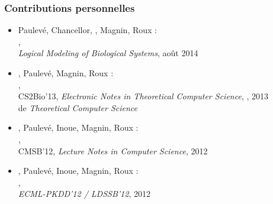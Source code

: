 \begin{frame}[c]
  \frametitle{Contributions personnelles}

\small
{}
\begin{itemize}
  \item Paulevé, Chancellor, , Magnin, Roux :\\
    ,\\
    \textit{Logical Modeling of Biological Systems},
    août 2014%
\end{itemize}

\medskip
{}
\begin{itemize}
  \item {}, Paulevé, Magnin, Roux :\\
    ,\\
    CS2Bio'13,
    \textit{Electronic Notes in Theoretical Computer Science}, , 2013\\
     de \textit{Theoretical Computer Science}
  \item {}, Paulevé, Inoue, Magnin, Roux :\\
    ,\\ %
    CMSB'12, \textit{Lecture Notes in Computer Science}, %
    2012
  \item {}, Paulevé, Inoue, Magnin, Roux :\\
    ,\\
    \textit{ECML-PKDD'12 / LDSSB'12}, %
    2012
\end{itemize}


\end{frame}

